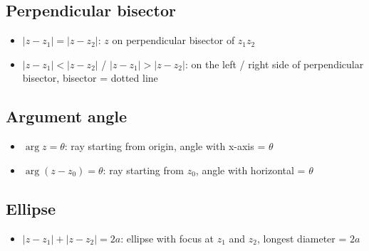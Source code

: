 \subsection{Perpendicular bisector}
\begin{itemize}
    \item $|z-z_1|=|z-z_2|$: $z$ on perpendicular bisector of $z_1z_2$
    \item $|z-z_1|<|z-z_2|$ / $|z-z_1|>|z-z_2|$: on the left / right side of perpendicular bisector, bisector = dotted line
\end{itemize}
\subsection{Argument angle}
\begin{itemize}
    \item $\arg z = \theta$: ray starting from origin, angle with x-axis = $\theta$
    \item $\arg (z-z_0) = \theta$: ray starting from $z_0$, angle with horizontal = $\theta$
\end{itemize}
\subsection{Ellipse}
\begin{itemize}
    \item $|z-z_1|+|z-z_2|=2a$: ellipse with focus at $z_1$ and $z_2$, longest diameter = $2a$
\end{itemize}

